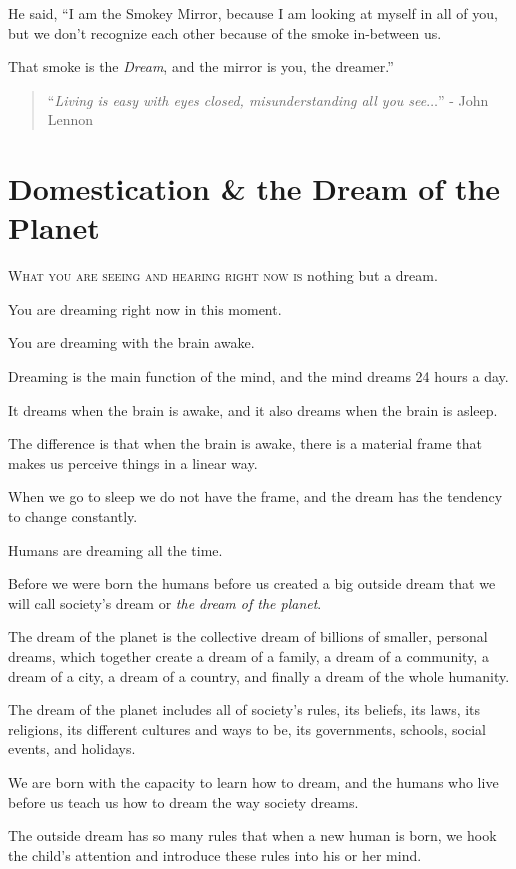 \documentclass{article}
\numberwithin{equation}{section}
\begin{document}
He said, ``I am the Smokey Mirror, because I am looking at myself in all of you, but we don't recognize each other because of the smoke in-between us.

That smoke is the \textit{Dream}, and the mirror is you, the dreamer.''
\begin{quotation}
    ``\textit{Living is easy with eyes closed, misunderstanding all you see}$\ldots$'' - John Lennon
\end{quotation}

\section{Domestication \& the Dream of the Planet}
\textsc{What you are seeing and hearing right now is} nothing but a dream.

You are dreaming right now in this moment.

You are dreaming with the brain awake.

%
Dreaming is the main function of the mind, and the mind dreams 24 hours a day.

It dreams when the brain is awake, and it also dreams when the brain is asleep.

The difference is that when the brain is awake, there is a material frame that makes us perceive things in a linear way.

When we go to sleep we do not have the frame, and the dream has the tendency to change constantly.

%
Humans are dreaming all the time.

Before we were born the humans before us created a big outside dream that we will call society's dream or \textit{the dream of the planet}.

The dream of the planet is the collective dream of billions of smaller, personal dreams, which together create a dream of a family, a dream of a community, a dream of a city, a dream of a country, and finally a dream of the whole humanity.

The dream of the planet includes all of society's rules, its beliefs, its laws, its religions, its different cultures and ways to be, its governments, schools, social events, and holidays.

%
We are born with the capacity to learn how to dream, and the humans who live before us teach us how to dream the way society dreams.

The outside dream has so many rules that when a new human is born, we hook the child's attention and introduce these rules into his or her mind.
\end{document}
